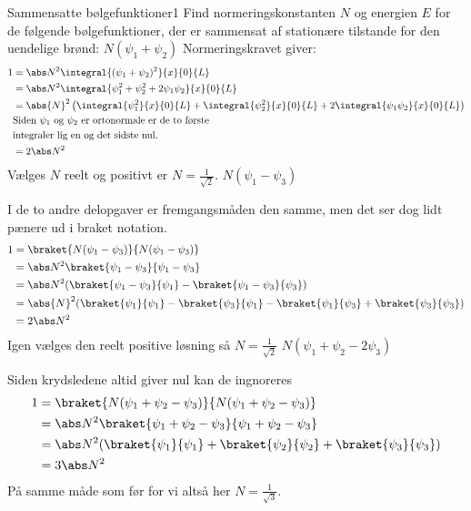 \begin{opgave}{Sammensatte bølgefunktioner}{1}
Find normeringskonstanten $N$ og energien $E$ for de følgende bølgefunktioner, der er sammensat af stationære tilstande for den uendelige brønd:
\opg $N(\psi_1+\psi_2)$
Normeringskravet giver:
\begin{align*}
    1&= \abs N^2\integral{(\psi_1+\psi_2)^2}{x}{0}{L}\\
    &= \abs N^2\integral{\psi_1^2+\psi_2^2+2\psi_1\psi_2}{x}{0}{L}\\
    &= \abs{N}^2\left(\integral{\psi_1^2}{x}{0}{L}+\integral{\psi_2^2}{x}{0}{L}+2\integral{\psi_1\psi_2}{x}{0}{L}\right)\\
    &\text{Siden $\psi_1$ og $\psi_2$ er ortonormale er de to første}\\
    &\text{integraler lig en og det sidste nul.}\\
    &= 2\abs N^2
\end{align*}
Vælges $N$ reelt og positivt er $N=\frac{1}{\sqrt{2}}$.
\opg $N(\psi_1-\psi_3)$

I de to andre delopgaver er fremgangsmåden den samme, men det ser dog lidt pænere ud i braket notation.
\begin{align*}
    1 &= \braket{N(\psi_1-\psi_3)}{N(\psi_1-\psi_3)}\\
    &= \abs N^2 \braket{\psi_1-\psi_3}{\psi_1-\psi_3}\\
    &= \abs N^2 (\braket{\psi_1-\psi_3}{\psi_1}-\braket{\psi_1-\psi_3}{\psi_3})\\
    &= \abs{N}^2(\braket{\psi_1}{\psi_1}-\braket{\psi_3}{\psi_1}-\braket{\psi_1}{\psi_3}+\braket{\psi_3}{\psi_3})\\
    &= 2\abs N^2
\end{align*}
Igen vælges den reelt positive løsning så $N=\frac{1}{\sqrt{2}}$
\opg $N(\psi_1+\psi_2-2\psi_3)$

Siden krydsledene altid giver nul kan de ingnoreres
\begin{align*}
    1 &= \braket{N(\psi_1+\psi_2-\psi_3)}{N(\psi_1+\psi_2-\psi_3)}\\
    &= \abs N^2 \braket{\psi_1+\psi_2-\psi_3}{\psi_1+\psi_2-\psi_3}\\
    &= \abs N^2(\braket{\psi_1}{\psi_1}+\braket{\psi_2}{\psi_2}+\braket{\psi_3}{\psi_3})\\
    &= 3\abs N^2
\end{align*}
På samme måde som før for vi altså her $N=\frac{1}{\sqrt{3}}$.
\end{opgave}

